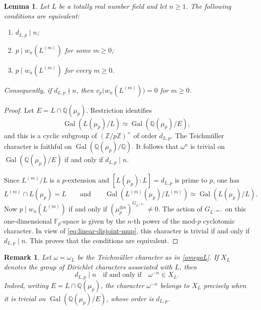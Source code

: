\documentclass[11pt,table]{amsart}
\newtheorem{lemma}[theorem]{Lemma}
\newtheorem{remark}[theorem]{Remark}
\numberwithin{equation}{section}
\begin{document}
\begin{lemma}
\label{lem:w-factor-equivalences}
Let \(L\) be a totally real number field and let \(n\geq1\). The following
conditions are equivalent:
\begin{enumerate}
\item \(d_{L,p}\mid n\);
\item \(p\mid w_n(L^{(m)})\) for some \(m\geq0\);
\item \(p\mid w_n(L^{(m)})\) for every \(m\geq0\).
\end{enumerate}
Consequently, if \(d_{L,p}\nmid n\), then $v_p\bigl(w_n(L^{(m)})\bigr)=0$ for $m\geq0$.
\end{lemma}
\begin{proof}
Let \(E=L\cap\mathbb Q(\mu_p)\). Restriction identifies
\[
        \operatorname{Gal}(L(\mu_p)/L)
        \simeq
        \operatorname{Gal}(\mathbb Q(\mu_p)/E),
\]
and this is a cyclic subgroup of
\((\mathbb Z/p\mathbb Z)^\times\) of order \(d_{L,p}\). The
Teichm\"uller character is faithful on
\(\operatorname{Gal}(\mathbb Q(\mu_p)/\mathbb Q)\). It follows that
\(\omega^n\) is trivial on
\(\operatorname{Gal}(\mathbb Q(\mu_p)/E)\) if and only if
\(d_{L,p}\mid n\).

\par Since \(L^{(m)}/L\) is a \(p\)-extension and
\([L(\mu_p):L]=d_{L,p}\) is prime to \(p\), one has
\begin{equation}
        L^{(m)}\cap L(\mu_p)=L
        \qquad\text{and}\qquad
        \operatorname{Gal}(L^{(m)}(\mu_p)/L^{(m)})
        \simeq
        \operatorname{Gal}(L(\mu_p)/L).
        \label{eq:linear-disjoint-mup}
\end{equation}
Now \(p\mid w_n(L^{(m)})\) if and only if
\((\mu_p^{\otimes n})^{G_{L^{(m)}}}\neq 0\). The action of
\(G_{L^{(m)}}\) on this one-dimensional \(\mathbb F_p\)-space is given
by the \(n\)-th power of the mod-\(p\) cyclotomic character. In view of
\eqref{eq:linear-disjoint-mup}, this character is trivial if and only
if \(d_{L,p}\mid n\). This proves that the conditions are equivalent.
\end{proof}
\begin{remark}
Let $\omega=\omega_L$ be the Teichm\"uller character as in \eqref{omegaL}. If \(X_L\) denotes the group of
Dirichlet characters associated with \(L\), then
\[
        d_{L,p}\mid n
        \quad\text{if and only if}\quad
        \omega^{-n}\in X_L.
\]
Indeed, writing \(E=L\cap\mathbb Q(\mu_p)\), the character
\(\omega^{-n}\) belongs to \(X_L\) precisely when it is trivial on
\(\operatorname{Gal}(\mathbb Q(\mu_p)/E)\), whose order is
\(d_{L,p}\).
\end{remark}
\end{document}
